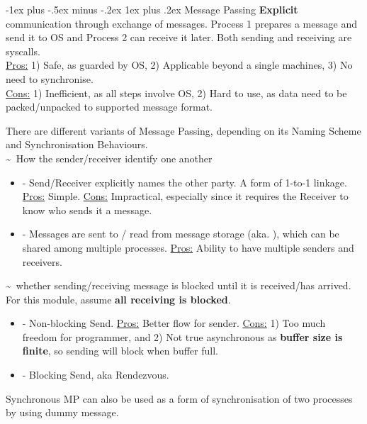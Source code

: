 \documentclass[10pt,landscape,letterpaper]{article}
\makeatletter
\renewcommand{\subsubsection}{\@startsection{subsubsection}{3}{0mm}%
                                {-1ex plus -.5ex minus -.2ex}%
                                {1ex plus .2ex}%
                                {\normalfont\small\itshape}}
\makeatother
\begin{document}
\begin{multicols}{3}
\subsubsection{Message Passing}
\textbf{Explicit} communication through exchange of messages. Process 1 prepares a message and send it to OS and Process 2 can receive it later. Both sending and receiving are syscalls.
\\
\underline{Pros:} 1) Safe, as guarded by OS, 2) Applicable beyond a single machines, 3) No need to synchronise.
\\
\underline{Cons:} 1) Inefficient, as all steps involve OS, 2) Hard to use, as data need to be packed/unpacked to supported message format.

\medskip

There are different variants of Message Passing, depending on its Naming Scheme and Synchronisation Behaviours.
\\
 \textasciitilde \ How the sender/receiver identify one another
\begin{itemize}
    \item {} - Send/Receiver explicitly names the other party. A form of 1-to-1 linkage. \underline{Pros:} Simple. \underline{Cons:} Impractical, especially since it requires the Receiver to know who sends it a message.
    \item {} - Messages are sent to / read from message storage (aka. ), which can be shared among multiple processes. \underline{Pros:} Ability to have multiple senders and receivers.
\end{itemize}

 \textasciitilde \ whether sending/receiving message is blocked until it is received/has arrived. For this module, assume \textbf{all receiving is blocked}.
\begin{itemize}
    \item {} - Non-blocking Send. \underline{Pros:} Better flow for sender. \underline{Cons:} 1) Too much freedom for programmer, and 2) Not true asynchronous as \textbf{buffer size is finite}, so sending will block when buffer full.
    \item {} - Blocking Send, aka Rendezvous.
\end{itemize}
Synchronous MP can also be used as a form of synchronisation of two processes by using dummy message.




\end{multicols}
\end{document}

